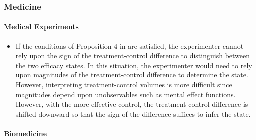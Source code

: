 \documentclass[11pt]{book}
\begin{document}
\subsubsection{Medicine}
\paragraph{Medical Experiments}
\begin{itemize}
\item If the conditions of Proposition 4 in \cite{chemla2019controls}
are satisfied, the experimenter cannot rely upon the sign of the treatment-control
difference to distinguish between the two efficacy states. In this
situation, the experimenter would need to rely upon magnitudes of
the treatment-control difference to determine the state. However,
interpreting treatment-control volumes is more difficult since magnitudes
depend upon unobservables such as mental effect functions. However,
with the more effective control, the treatment-control difference
is shifted downward so that the sign of the difference suffices to
infer the state.
\end{itemize}
\paragraph{Biomedicine}
\end{document}
